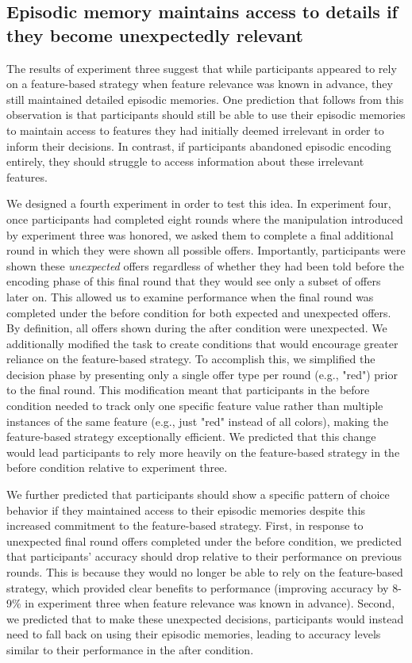 \documentclass[10pt,letterpaper]{article}
\begin{document}
\subsection{Episodic memory maintains access to details if they become unexpectedly relevant}

The results of experiment three suggest that while participants appeared to rely on a feature-based strategy when feature relevance was known in advance, they still maintained detailed episodic memories. One prediction that follows from this observation is that participants should still be able to use their episodic memories to maintain access to features they had initially deemed irrelevant in order to inform their decisions. In contrast, if participants abandoned episodic encoding entirely, they should struggle to access information about these irrelevant features.

We designed a fourth experiment in order to test this idea. In experiment four, once participants had completed eight rounds where the manipulation introduced by experiment three was honored, we asked them to complete a final additional round in which they were shown all possible offers. Importantly, participants were shown these \textit{unexpected} offers regardless of whether they had been told before the encoding phase of this final round that they would see only a subset of offers later on. This allowed us to examine performance when the final round was completed under the before condition for both expected and unexpected offers. By definition, all offers shown during the after condition were unexpected. We additionally modified the task to create conditions that would encourage greater reliance on the feature-based strategy. To accomplish this, we simplified the decision phase by presenting only a single offer type per round (e.g., "red") prior to the final round. This modification meant that participants in the before condition needed to track only one specific feature value rather than multiple instances of the same feature (e.g., just "red" instead of all colors), making the feature-based strategy exceptionally efficient. We predicted that this change would lead participants to rely more heavily on the feature-based strategy in the before condition relative to experiment three.

We further predicted that participants should show a specific pattern of choice behavior if they maintained access to their episodic memories despite this increased commitment to the feature-based strategy. First, in response to unexpected final round offers completed under the before condition, we predicted that participants' accuracy should drop relative to their performance on previous rounds. This is because they would no longer be able to rely on the feature-based strategy, which provided clear benefits to performance (improving accuracy by 8-9\% in experiment three when feature relevance was known in advance). Second, we predicted that to make these unexpected decisions, participants would instead need to fall back on using their episodic memories, leading to accuracy levels similar to their performance in the after condition.
\end{document}
